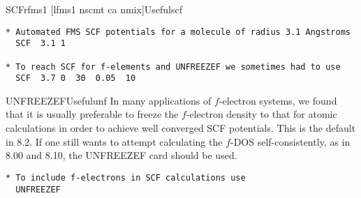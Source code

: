 \documentclass[11pt,oneside]{report} %
\begin{document}
\begin{Card}{SCF}{rfms1 [lfms1 nscmt ca nmix]}{Useful}{scf}
\begin{verbatim}
* Automated FMS SCF potentials for a molecule of radius 3.1 Angstroms
  SCF  3.1 1

* To reach SCF for f-elements and UNFREEZEF we sometimes had to use
  SCF  3.7 0  30  0.05  10
\end{verbatim}
\end{Card}

\begin{Card}{UNFREEZEF}{}{Useful}{unf}
In many applications of $f$-electron
systems, we found that it is usually preferable to freeze the $f$-electron
density to that for atomic calculations in order to achieve well converged
SCF potentials. This is the default in {\feff}8.2. If one still wants
to attempt calculating the $f$-DOS self-consistently,
as in {\feff}8.00 and 8.10, the UNFREEZEF card should be used.
\begin{verbatim}
* To include f-electrons in SCF calculations use
  UNFREEZEF 
\end{verbatim}
\end{Card}
\end{document}

